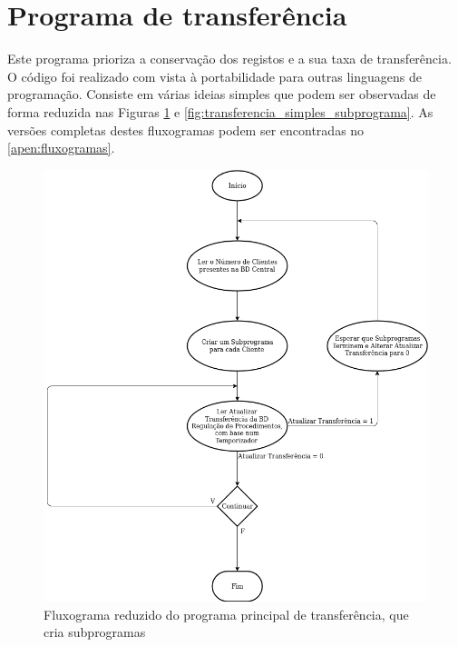 \documentclass[11pt,twoside,a4paper]{report}
\begin{document}
\section{Programa de transferência}
\label{subchap:transferencia}
Este programa prioriza a conservação dos registos e a sua taxa de transferência. O código foi realizado com vista à portabilidade para outras linguagens de programação. Consiste em várias ideias simples que podem ser observadas de forma reduzida nas Figuras \ref{fig:transferencia_simples_programa} e \ref{fig:transferencia_simples_subprograma}. As versões completas destes fluxogramas podem ser encontradas no \autoref{apen:fluxogramas}.\par
\begin{figure}
	\begin{center}
		\includegraphics[width=1\textwidth]{fluxograma_simples_transferencia_programa01} %
		\caption[Fluxograma reduzido do programa principal de transferência]{Fluxograma reduzido do programa principal de transferência, que cria subprogramas}
		\label{fig:transferencia_simples_programa}
	\end{center}
\end{figure}
\end{document}
